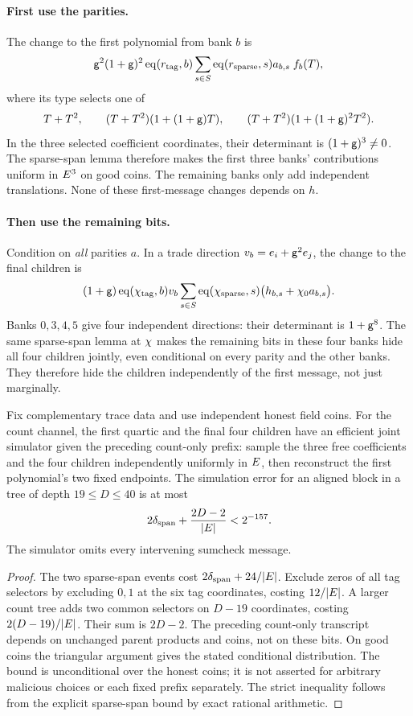 \paragraph{First use the parities.} The change to the first polynomial from bank $b$ is
\[
 \mathsf{g}^2(1+\mathsf{g})^2\operatorname{eq}(r_{\mathrm{tag}},b)
 \sum_{s\in S}\operatorname{eq}(r_{\mathrm{sparse}},s)a_{b,s}\;f_b(T),
\]
where its type selects one of
\[
 T+T^2,\qquad
 (T+T^2)(1+(1+\mathsf{g})T),\qquad
 (T+T^2)(1+(1+\mathsf{g})^2T^2).
\]
In the three selected coefficient coordinates, their determinant is $(1+\mathsf{g})^3\ne0$. The sparse-span lemma therefore makes the first three banks' contributions uniform in $E^3$ on good coins. The remaining banks only add independent translations. None of these first-message changes depends on $h$.

\paragraph{Then use the remaining bits.} Condition on \emph{all} parities $a$. In a trade direction $v_b=e_i+\mathsf{g}^2e_j$, the change to the final children is
\[
 (1+\mathsf{g})\operatorname{eq}(\chi_{\mathrm{tag}},b)v_b
 \sum_{s\in S}\operatorname{eq}(\chi_{\mathrm{sparse}},s)
 \bigl(h_{b,s}+\chi_0a_{b,s}\bigr).
\]
Banks $0,3,4,5$ give four independent directions: their determinant is $1+\mathsf{g}^8$. The same sparse-span lemma at $\chi$ makes the remaining bits in these four banks hide all four children jointly, even conditional on every parity and the other banks. They therefore hide the children independently of the first message, not just marginally.

\begin{theorem}
Fix complementary trace data and use independent honest field coins. For the count channel, the first quartic and the final four children have an efficient joint simulator given the preceding count-only prefix: sample the three free coefficients and the four children independently uniformly in $E$, then reconstruct the first polynomial's two fixed endpoints. The simulation error for an aligned block in a tree of depth $19\le D\le40$ is at most
\[
 2\delta_{\mathrm{span}}+\frac{2D-2}{|E|}<2^{-157}.
\]
The simulator omits every intervening sumcheck message.
\end{theorem}
\begin{proof}
The two sparse-span events cost $2\delta_{\mathrm{span}}+24/|E|$. Exclude zeros of all tag selectors by excluding $0,1$ at the six tag coordinates, costing $12/|E|$. A larger count tree adds two common selectors on $D-19$ coordinates, costing $2(D-19)/|E|$. Their sum is $2D-2$. The preceding count-only transcript depends on unchanged parent products and coins, not on these bits. On good coins the triangular argument gives the stated conditional distribution. The bound is unconditional over the honest coins; it is not asserted for arbitrary malicious choices or each fixed prefix separately. The strict inequality follows from the explicit sparse-span bound by exact rational arithmetic.
\end{proof}

